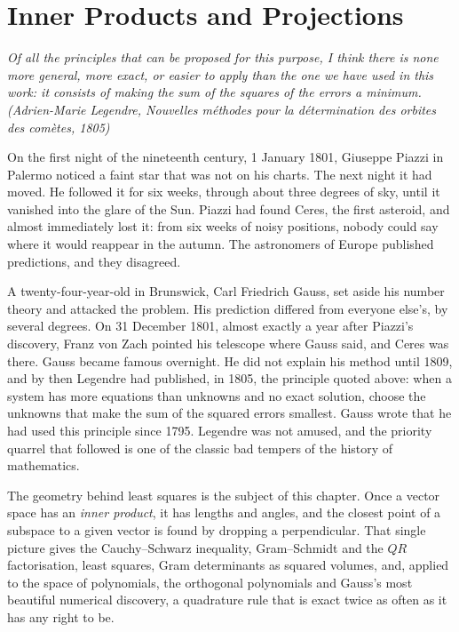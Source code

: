 \chapter{Inner Products and Projections}\label{linear:ch:inner}

\begin{center}\itshape
Of all the principles that can be proposed for this purpose, I think there is none more general, more exact, or easier
to apply than the one we have used in this work: it consists of making the sum of the squares of the errors a minimum.
\upshape(Adrien-Marie Legendre, \emph{Nouvelles m\'ethodes pour la d\'etermination des orbites des com\`etes}, 1805)
\end{center}

On the first night of the nineteenth century, 1 January 1801, Giuseppe Piazzi in Palermo noticed a faint star that
was not on his charts. The next night it had moved. He followed it for six weeks, through about three degrees of sky,
until it vanished into the glare of the Sun. Piazzi had found Ceres, the first asteroid, and almost immediately lost
it: from six weeks of noisy positions, nobody could say where it would reappear in the autumn. The astronomers of
Europe published predictions, and they disagreed.

A twenty-four-year-old in Brunswick, Carl Friedrich Gauss, set aside his number theory and attacked the problem. His
prediction differed from everyone else's, by several degrees. On 31 December 1801, almost exactly a year after Piazzi's
discovery, Franz von Zach pointed his telescope where Gauss said, and Ceres was there. Gauss became famous overnight.
He did not explain his method until 1809, and by then Legendre had published, in 1805, the principle quoted above: when
a system has more equations than unknowns and no exact solution, choose the unknowns that make the sum of the squared
errors smallest. Gauss wrote that he had used this principle since 1795. Legendre was not amused, and the priority
quarrel that followed is one of the classic bad tempers of the history of mathematics.

The geometry behind least squares is the subject of this chapter. Once a vector space has an \emph{inner product}, it
has lengths and angles, and the closest point of a subspace to a given vector is found by dropping a perpendicular. That
single picture gives the Cauchy--Schwarz inequality, Gram--Schmidt and the $QR$ factorisation, least squares, Gram
determinants as squared volumes, and, applied to the space of polynomials, the orthogonal polynomials and Gauss's most
beautiful numerical discovery, a quadrature rule that is exact twice as often as it has any right to be.

